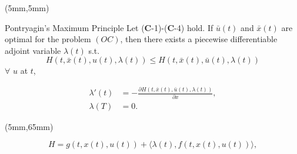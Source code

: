 \begin{frame}[plain]
	\begin{textblock*}{120mm}(5mm,5mm)
		\begin{graybox}{Pontryagin’s Maximum Principle}
			Let ($\mathbf{C}$-1)-($\mathbf{C}$-4) hold. If $\bar{u}(t)$ and $\bar{x}(t)$ are optimal for the problem $(OC)$, then there exists a piecewise differentiable adjoint variable $\lambda(t)$ s.t.
				\begin{equation*}
					H(t,\bar{x}(t),u(t),\lambda(t))\leq H(t,\bar{x}(t),\bar{u}(t),\lambda(t))
				\end{equation*}
			$\forall$ $u$ at $t$,

				\begin{align*}
					\lambda'(t) &= -\frac{\partial H(t,\bar{x}(t),\bar{u}(t),\lambda(t))}{\partial x},\\
					\lambda(T) &= 0.
				\end{align*}
		\end{graybox}
		
	\end{textblock*}
		\begin{textblock*}{75mm}(5mm,65mm)
		\begin{yellowbox}{}
			\begin{equation*}
			H=g(t,x(t),u(t))+\langle \lambda(t),f(t,x(t),u(t))\rangle,
			\end{equation*}
		\end{yellowbox}
	\end{textblock*}
\end{frame}

